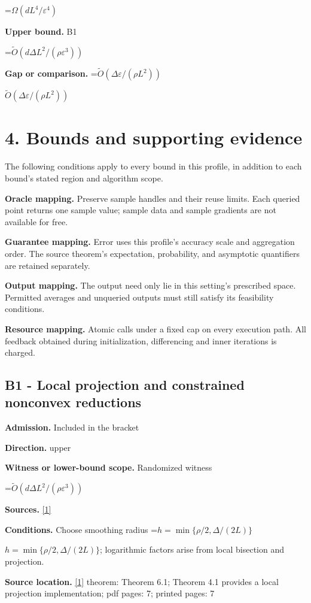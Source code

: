 \documentclass[10pt,a4paper]{article}
\newcommand{\AtlasMath}[1]{\par\begingroup\centering\setbox0=\hbox{$\displaystyle #1$}\ifdim\wd0>1.4\linewidth\typeout{ATLAS WIDE FORMULA: \the\wd0}\fi\ifdim\wd0>\linewidth\resizebox{\linewidth}{!}{\box0}\else\box0\fi\par\endgroup}
\newcommand{\AtlasInlineMath}[1]{\begingroup\setbox0=\hbox{$#1$}\ifdim\wd0>.4\linewidth\endgroup\AtlasMath{#1}\else\endgroup$#1$\fi}
\begin{document}
\AtlasMath{\Omega(dL^4/\varepsilon^4)}
\textbf{Upper bound.} B1

\AtlasMath{\widetilde{O}(d\Delta L^2/(\rho\varepsilon^3))}
\textbf{Gap or comparison.} \AtlasInlineMath{\widetilde{O}(\Delta\varepsilon/(\rho L^2))}

\section{4. Bounds and supporting evidence}
The following conditions apply to every bound in this profile, in addition to each bound's stated region and algorithm scope.

\textbf{Oracle mapping.} Preserve sample handles and their reuse limits. Each queried point returns one sample value; sample data and sample gradients are not available for free.

\textbf{Guarantee mapping.} Error uses this profile's accuracy scale and aggregation order. The source theorem's expectation, probability, and asymptotic quantifiers are retained separately.

\textbf{Output mapping.} The output need only lie in this setting's prescribed space. Permitted averages and unqueried outputs must still satisfy its feasibility conditions.

\textbf{Resource mapping.} Atomic calls under a fixed cap on every execution path. All feedback obtained during initialization, differencing and inner iterations is charged.

\subsection{B1 - Local projection and constrained nonconvex reductions}
\textbf{Admission.} Included in the bracket

\textbf{Direction.} upper

\textbf{Witness or lower-bound scope.} Randomized witness

\AtlasMath{\widetilde{O}(d\Delta L^2/(\rho\varepsilon^3))}
\textbf{Sources.} \href{https://arxiv.org/abs/2610.13787v1}{[1]}

\textbf{Conditions.} Choose smoothing radius \AtlasInlineMath{h=\min\{\rho/2,\Delta/(2L)\}}; logarithmic factors arise from local bisection and projection.

\textbf{Source location.} \href{https://arxiv.org/abs/2610.13787v1}{[1]} theorem: Theorem 6.1; Theorem 4.1 provides a local projection implementation; pdf pages: 7; printed pages: 7
\end{document}
